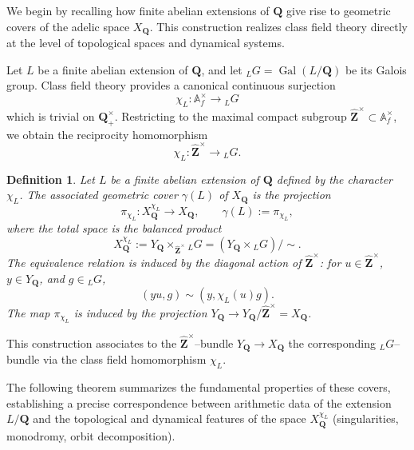 \documentclass[11pt,a4paper]{article}
\newcommand{\Q}{\mathbf{Q}}
\newcommand{\Z}{\mathbf{Z}}
\newcommand{\A}{\mathbb{A}}
\newcommand{\Zhat}{\widehat{\Z}}
\theoremstyle{plain}
\newtheorem{defn}[thm]{Definition}
\theoremstyle{definition} %
\begin{document}
We begin by recalling how finite abelian extensions of $\Q$ give rise to geometric
covers of the adelic space $X_\Q$.  This construction realizes class field theory
directly at the level of topological spaces and dynamical systems.

Let $L$ be a finite abelian extension of $\Q$, and let ${}_LG = \operatorname{Gal}(L/\Q)$ be its
Galois group.  Class field theory provides a canonical continuous surjection
\[
\chi_L : \A_f^\times \longrightarrow {}_LG
\]
which is trivial on $\Q_+^\times$.  Restricting to the maximal compact subgroup
$\Zhat^\times \subset \A_f^\times$, we obtain the reciprocity homomorphism
\[
\chi_L : \Zhat^\times \longrightarrow {}_LG .
\]

\begin{defn}
\label{coverdef}
Let $L$ be a finite abelian extension of $\Q$ defined by the character $\chi_L$.
The associated geometric cover $\gamma(L)$ of $X_\Q$ is the projection
\[
\pi_{\chi_L} : X_\Q^{\chi_L} \longrightarrow X_\Q ,
\qquad \gamma(L) := \pi_{\chi_L},
\]
where the total space is the balanced product
\[
X_\Q^{\chi_L} := Y_\Q \times_{\Zhat^\times} {}_LG
               = (Y_\Q \times {}_LG)/\!\sim .
\]
The equivalence relation is induced by the diagonal action of $\Zhat^\times$:
for $u \in \Zhat^\times$, $y \in Y_\Q$, and $g \in {}_LG$,
\[
(yu, g) \sim (y, \chi_L(u) g).
\]
The map $\pi_{\chi_L}$ is induced by the projection
$Y_\Q \to Y_\Q/\Zhat^\times = X_\Q$.
\end{defn}

This construction associates to the  $\Zhat^\times$--bundle
$Y_\Q \to X_\Q$ the corresponding  ${}_LG$--bundle via the class field
homomorphism $\chi_L$.

The following theorem summarizes the fundamental properties of these covers,
establishing a precise correspondence between arithmetic data of the extension
$L/\Q$ and the topological and dynamical features of the space $X_\Q^{\chi_L}$ (singularities, monodromy, orbit decomposition).
\end{document}
